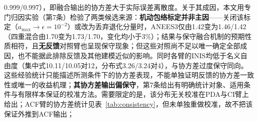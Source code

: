 \documentclass[UTF8,a4paper,zihao=-4]{ctexart}
\begin{document}
\begin{enumerate}
0.999/0.997），即融合输出的协方差大于实际误差离散度。关于其成因，本文用专门归因实验（第7条）检验了两类候选来源：\textbf{机动包络标定并非主因}——关闭该标定（$a_{\max}\to\epsilon=10^{-2}$）或改为丢弃退化分量时，ANEES3仅由1.42变为1.46/1.42（四重混合由1.70变为1.73/1.70，变化均小于3\%）；结果与保守融合机制的预期性质相符，且\textbf{无反馈}对照臂也呈现保守现象；但这些对照尚不足以唯一确定全部成因，也不能据此排除反馈及其他建模近似的影响。同时各臂的INIS均低于名义自由度（集中式10.11/10.05对12，分布式3.26/3.24对4），与协方差过度保守同向。这些经验统计只能描述所测条件下的协方差表现，不能单独证明反馈的协方差一致性或唯一的收益机理；\textbf{其协方差输出偏保守}，第7条给出有明确统计对象、适用条件与有限样本保证的校准方法。需要限定的是，该分布无关校准在PDA与CI臂上给出；ACF臂的协方差统计见表~\ref{tab:consistency}，但未单独重做校准，故不把该保证外推到ACF输出；

\end{enumerate}
\end{document}
